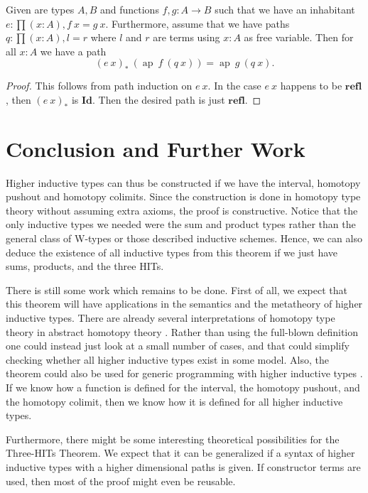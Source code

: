\documentclass[a4paper,UKenglish]{lipics-v2016}
\newcommand{\Boperator}[1]{\mathrm{\mathbf{#1}}}
\newcommand{\ap}[0]{\operatorname{ap}}
\newcommand{\idmap}[0]{\Boperator{Id}}
\newcommand{\refl}[0]{\Boperator{refl}}
\begin{document}
\begin{lemma}
\label{lem:pathext}
Given are types $A, B$ and functions $f, g : A \rightarrow B$ such that we have an inhabitant $e : \prod (x : A), f \> x = g \> x$.
Furthermore, assume that we have paths $q : \prod (x : A), l = r$ where $l$ and $r$ are terms using $x : A$ as free variable.
Then for all $x : A$ we have a path
\[
(e \> x)_* \> (\ap \> f \> (q \> x)) = \ap \> g \> (q \> x).
\]
\end{lemma}

\begin{proof}
This follows from path induction on $e \> x$.
In the case $e \> x$ happens to be $\refl$, then $(e \> x)_*$ is $\idmap$.
Then the desired path is just $\refl$.
\end{proof}

\section{Conclusion and Further Work}
Higher inductive types can thus be constructed if we have the interval, homotopy pushout and homotopy colimits.
Since the construction is done in homotopy type theory without assuming extra axioms, the proof is constructive.
Notice that the only inductive types we needed were the sum and product types rather than the general class of W-types or those described inductive schemes.
Hence, we can also deduce the existence of all inductive types from this theorem if we just have sums, products, and the three HITs. 

There is still some work which remains to be done.
First of all, we expect that this theorem will have applications in the semantics and the metatheory of higher inductive types.
There are already several interpretations of homotopy type theory in abstract homotopy theory \cite{arndt2011homotopy,awodey2009homotopy,bezem2014model,cohen2016cubical,kapulkin2012simplicial}.
Rather than using the full-blown definition one could instead just look at a small number of cases, and that could simplify checking whether all higher inductive types exist in some model.
Also, the theorem could also be used for generic programming with higher inductive types \cite{altenkirch2003generic}.
If we know how a function is defined for the interval, the homotopy pushout, and the homotopy colimit, then we know how it is defined for all higher inductive types.

Furthermore, there might be some interesting theoretical possibilities for the Three-HITs Theorem.
We expect that it can be generalized if a syntax of higher inductive types with a higher dimensional paths is given.
If constructor terms are used, then most of the proof might even be reusable.
\end{document}
